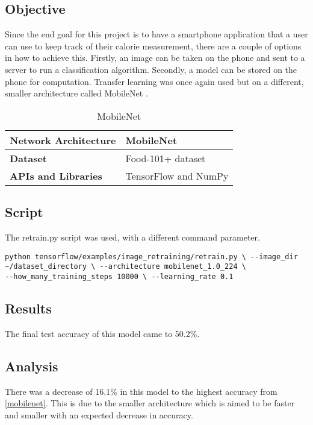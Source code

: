 \tocless\subsection{Objective}
Since the end goal for this project is to have a smartphone
application that a user can use to keep track of their calorie measurement,
there are a couple of options in how to achieve this. Firstly, an image can be
taken on the phone and sent to a server to run a classification algorithm.
Secondly, a model can be stored on the phone for computation. Transfer learning was once again used but on a different, smaller architecture called MobileNet \parencite{mobilenet}.

\begin{table}[h]
\centering
\caption{MobileNet}
\label{my-label}
\begin{tabular}{|l|p{8cm}|}
\hline
\textbf{Network Architecture} & MobileNet           \\ \hline
\textbf{Dataset}              & Food-101+ dataset \\ \hline
\textbf{APIs and Libraries}   & TensorFlow and NumPy                                                       \\ \hline
\end{tabular}
\end{table}

\tocless\subsection{Script}
The retrain.py script \parencite{retrainInception} was used, with a different
command parameter.

\begin{lstlisting}[style=Command]
python tensorflow/examples/image_retraining/retrain.py \ --image_dir
~/dataset_directory \ --architecture mobilenet_1.0_224 \
--how_many_training_steps 10000 \ --learning_rate 0.1
\end{lstlisting}

\tocless\subsection{Results}
The final test accuracy of this model came to 50.2\%.

\tocless\subsection{Analysis}
There was a decrease of 16.1\% in this model to the highest accuracy from
\ref{mobilenet}. This is due to the smaller architecture which is aimed to be faster
and smaller with an expected decrease in accuracy.
